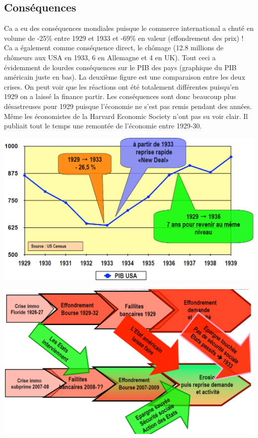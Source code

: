 \subsection{Conséquences}
Ca a eu des conséquences mondiales puisque le commerce international a chuté en volume de -25\% entre 1929 et 1933 et -69\% en valeur (effondrement des prix) ! Ca a également comme conséquence direct, le chômage (12.8 millions de chômeurs aux USA en 1933, 6 en Allemagne et 4 en UK). Tout ceci a évidemment de lourdes conséquences sur le PIB des pays (graphique du PIB américain juste en bas). La deuxième figure est une comparaison entre les deux crises. On peut voir que les réactions ont été totalement différentes puisqu'en 1929 on a laissé la finance partir. Les conséquences sont donc beaucoup plus désastreuses pour 1929 puisque l'économie ne s'est pas remis pendant des années. Même les économistes de la Harvard Economic Society n'ont pas su voir clair. Il publiait tout le temps une remontée de l'économie entre 1929-30. \\

\begin{minipage}{0.5\textwidth}
	\begin{flushleft}
		\includegraphics[scale=0.3]{49}
	\end{flushleft}
\end{minipage}
\begin{minipage}{0.5\textwidth}
	\begin{center}
		\includegraphics[scale=0.26]{50}
	\end{center}
\end{minipage}

